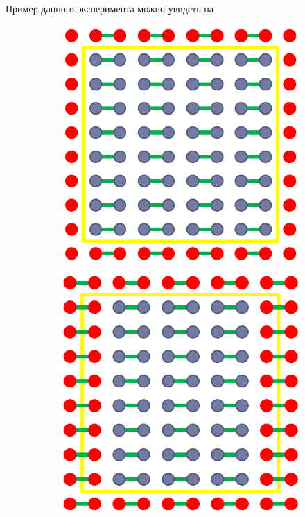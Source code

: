 	Пример данного эксперимента можно увидеть на 
	
	\begin{figure}[ht]
		\begin{subfigure}[t]{\dimexpr.5\linewidth-1.3em\relax}
			\centering
			\includegraphics[width=.65\linewidth,valign=t]{my_folder/images/chunk_structural_1}
		\end{subfigure}
		\hfill %
		\begin{subfigure}[t]{\dimexpr.5\linewidth-1.3em\relax}
			\centering
			\includegraphics[width=.65\linewidth,valign=t]{my_folder/images/chunk_structural_2}
		\end{subfigure}
		\\[20pt]	

\end{figure}
